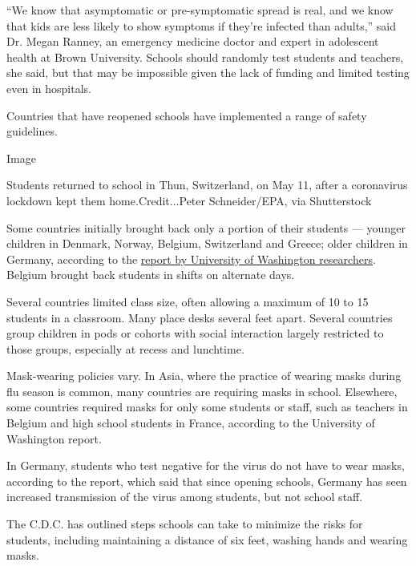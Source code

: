 ``We know that asymptomatic or pre-symptomatic spread is real, and we
know that kids are less likely to show symptoms if they're infected than
adults,'' said Dr. Megan Ranney, an emergency medicine doctor and expert
in adolescent health at Brown University. Schools should randomly test
students and teachers, she said, but that may be impossible given the
lack of funding and limited testing even in hospitals.

Countries that have reopened schools have implemented a range of safety
guidelines.

Image

Students returned to school in Thun, Switzerland, on May 11, after a
coronavirus lockdown kept them home.Credit...Peter Schneider/EPA, via
Shutterstock

Some countries initially brought back only a portion of their students
--- younger children in Denmark, Norway, Belgium, Switzerland and
Greece; older children in Germany, according to the
\href{https://globalhealth.washington.edu/sites/default/files/COVID-19\%20Schools\%20Summary\%20\%282\%29.pdf?mkt_tok=eyJpIjoiTkRreE5XWXlORFF3TXpNeCIsInQiOiJIbVNQTTVySEo0Vzk1cHVBZVVqWnFGVmR1UEJxRGdpd01mTXg4OGw3Mk5nTnpmaUoyMGt2UXIwWVZBOE5GVjIybHA5aStrbzJ3MUxsanoxamZibmlocmpSbXZyVFVoV0VHYU1aTGx0RnpsMXlmOEtXSVJqaDJsZ0RJU1BQcVZjZSJ9}{report
by University of Washington researchers}. Belgium brought back students
in shifts on alternate days.

Several countries limited class size, often allowing a maximum of 10 to
15 students in a classroom. Many place desks several feet apart. Several
countries group children in pods or cohorts with social interaction
largely restricted to those groups, especially at recess and lunchtime.

Mask-wearing policies vary. In Asia, where the practice of wearing masks
during flu season is common, many countries are requiring masks in
school. Elsewhere, some countries required masks for only some students
or staff, such as teachers in Belgium and high school students in
France, according to the University of Washington report.

In Germany, students who test negative for the virus do not have to wear
masks, according to the report, which said that since opening schools,
Germany has seen increased transmission of the virus among students, but
not school staff.

The C.D.C. has outlined steps schools can take to minimize the risks for
students, including maintaining a distance of six feet, washing hands
and wearing masks.

